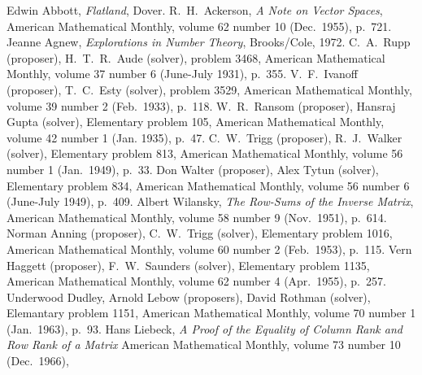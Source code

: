 \begin{thebibliography}{\makebox[2em][c]{{}\hfil{}}}
\thispagestyle{empty}
\small\setlength{\itemsep}{0ex} \setlength{\parsep}{0ex}
  Edwin Abbott,
  \emph{Flatland},
  Dover.
  R.\ H.\ Ackerson,
  \emph{A Note on Vector Spaces},
  American Mathematical Monthly,
  volume 62 number 10 (Dec.\ 1955),
  p.~721.
  Jeanne Agnew,
  \emph{Explorations in Number Theory},
  Brooks/Cole,
  1972.
  C.\ A.\ Rupp (proposer), H.\ T.\ R.\ Aude (solver),
  problem 3468,
  American Mathematical Monthly,
  volume 37 number 6 (June-July 1931),
  p.~355.
  V.\ F.\ Ivanoff (proposer), T.\ C.\ Esty (solver),
  problem 3529,
  American Mathematical Monthly,
  volume 39 number 2 (Feb.\ 1933),
  p.~118.
  W.\ R.\ Ransom (proposer), Hansraj Gupta (solver),
  Elementary problem 105,
  American Mathematical Monthly,
  volume 42 number 1 (Jan. 1935),
  p.~47.
  C.\ W.\ Trigg (proposer), R.\ J.\ Walker (solver),
  Elementary problem 813,
  American Mathematical Monthly,
  volume 56 number 1 (Jan.\ 1949),
  p.~33.
  Don Walter (proposer), Alex Tytun (solver),
  Elementary problem 834,
  American Mathematical Monthly,
  volume 56 number 6 (June-July 1949),
  p.~409.
  Albert Wilansky,
  \emph{The Row-Sums of the Inverse Matrix},
  American Mathematical Monthly,
  volume 58 number 9 (Nov.\ 1951),
  p.~614.
  Norman Anning (proposer), C.\ W.\ Trigg (solver),
  Elementary problem 1016,
  American Mathematical Monthly,
  volume 60 number 2 (Feb.\ 1953),
  p.~115.
  Vern Haggett (proposer), F.\ W.\ Saunders (solver),
  Elementary problem 1135,
  American Mathematical Monthly,
  volume 62 number 4 (Apr.\ 1955),
  p.~257.
  Underwood Dudley, Arnold Lebow (proposers), David Rothman (solver),
  Elemantary problem 1151,
  American Mathematical Monthly,
  volume 70 number 1 (Jan.\ 1963),
  p.~93.
  Hans Liebeck,
  \emph{A Proof of the Equality of Column Rank and Row Rank of a Matrix}
  American Mathematical Monthly,
  volume 73 number 10 (Dec.\ 1966),

\end{thebibliography}
